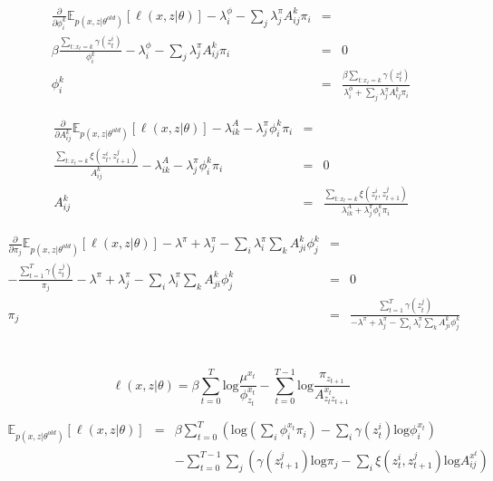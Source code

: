 \documentclass[11pt]{article}
\begin{document}
\begin{eqnarray*}
\frac{\partial}{\partial\phi^k_i} \mathbb{E}_{p(x,z|\theta^{old})}[\ell(x,z|\theta)] - \lambda^\phi_i - \sum_j \lambda^\pi_j A^k_{ij}\pi_i & = & \\
\beta \frac{\sum_{t:x_t = k}\gamma(z_t^i)}{\phi_i^k}  - \lambda^\phi_i  - \sum_j \lambda^\pi_j A^k_{ij}\pi_i & = & 0 \\
\phi^k_i & = & \frac{\beta \sum_{t:x_t = k} \gamma(z_t^i)}{\lambda^\phi_i + \sum_j \lambda^\pi_j A^k_{ij}\pi_i}
\end{eqnarray*}

\begin{eqnarray*}
\frac{\partial}{\partial A^k_{ij}} \mathbb{E}_{p(x,z|\theta^{old})}[\ell(x,z|\theta)] - \lambda^A_{ik} - \lambda^\pi_j \phi^k_i\pi_i & = & \\
\frac{\sum_{t:x_t=k}\xi(z_t^i,z_{t+1}^j)}{A^k_{ij}} - \lambda^A_{ik} - \lambda^\pi_j \phi^k_i\pi_i & = & 0 \\
A^k_{ij} & = & \frac{\sum_{t:x_t=k}\xi(z^i_t,z^j_{t+1})}{\lambda^A_{ik} + \lambda^\pi_j \phi^k_i \pi_i}
\end{eqnarray*}

\begin{eqnarray*}
\frac{\partial}{\partial \pi_j} \mathbb{E}_{p(x,z|\theta^{old})}[\ell(x,z|\theta)] - \lambda^\pi + \lambda^\pi_j - \sum_i \lambda^\pi_i\sum_k A^k_{ji}\phi^k_j & = & \\
- \frac{\sum_{t=1}^T\gamma(z^j_t)}{\pi_j} - \lambda^\pi + \lambda^\pi_j - \sum_i \lambda^\pi_i\sum_k A^k_{ji}\phi^k_j & = & 0 \\
\pi_j & = & \frac{\sum_{t=1}^T \gamma(z_t^j)}{-\lambda^\pi + \lambda^\pi_j - \sum_i\lambda^\pi_i \sum_k A^k_{ji}\phi^k_j}
\end{eqnarray*}

\section{}

\[
\ell(x,z|\theta) = \beta \sum_{t=0}^T \mathrm{log}\frac{\mu^{x_t}}{\phi^{x_t}_{z_t}} - \sum_{t=0}^{T-1} \mathrm{log}\frac{\pi_{z_{t+1}}}{A^{x_t}_{z_t z_{t+1}}}
\]

\begin{eqnarray*}
\mathbb{E}_{p(x,z|\theta^{old})}[\ell(x,z|\theta)] & = & \beta\sum_{t=0}^T \left(\mathrm{log}(\sum_i \phi_i^{x_t}\pi_i) - \sum_i \gamma(z_t^i) \mathrm{log}\phi_{i}^{x_t}\right) \\
& & - \sum_{t=0}^{T-1}\sum_j \left(\gamma(z_{t+1}^j)\mathrm{log}\pi_j - \sum_i \xi(z_{t}^i,z_{t+1}^j)\mathrm{log}A^{x^t}_{ij}\right)
\end{eqnarray*}
\end{document}
